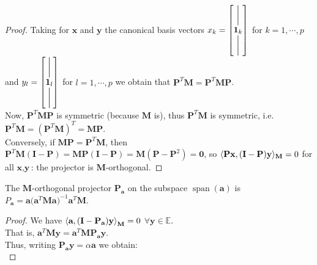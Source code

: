 \begin{notechapter}
\begin{proof}
Taking for $\textbf{x}$ and $\textbf{y}$ the canonical basis vectors $x_k = 
\begin{bmatrix*}
    \vertbar\\
    {\textbf{1}}_{k} \\
    \vertbar
\end{bmatrix*}$ for $k = 1, \cdots, p$ 
and  
$y_l = 
\begin{bmatrix*}
    \vertbar\\
    {\textbf{1}}_{l} \\
    \vertbar
\end{bmatrix*}$ for $l = 1, \cdots, p$ 
we obtain that  $\textbf{P}^T \textbf{M} = \textbf{P}^T \textbf{M} \textbf{P}$.\\

Now, $\textbf{P}^T \textbf{M} \textbf{P}$ is symmetric (because $\textbf{M}$ is), thus $\textbf{P}^T \textbf{M}$ is symmetric,
i.e.\ $\textbf{P}^T \textbf{M} = (\textbf{P}^T \textbf{M})^T = \textbf{M} \textbf{P}$.\\

Conversely, if $\textbf{M}\textbf{P} = \textbf{P}^T\textbf{M}$, then
$\textbf{P}^T \textbf{M} (\textbf{I} - \textbf{P}) = \textbf{M}\textbf{P}(\textbf{I} - \textbf{P}) = \textbf{M}(\textbf{P} - \textbf{P}^2) = \textbf{0}$,
so $\langle \textbf{P}\textbf{x}, (\textbf{I} - \textbf{P})\textbf{y} \rangle_{\textbf{M}} = 0$ for all $\textbf{x}, \textbf{y}$: the projector is $\textbf{M}$-orthogonal.

\end{proof}

\begin{proposition}
    The $\textbf{M}$-orthogonal projector $\textbf{P}_{\textbf{a}}$ on the subspace $\operatorname{span}(\textbf{a})$ is 
    $P_{\textbf{a}} = \textbf{a} \big( \textbf{a}^T \textbf{M} \textbf{a}\big)^{-1} \textbf{a}^T \textbf{M}$.
\end{proposition}

\begin{proof} We have
    ${\langle \textbf{a}, (\textbf{I} - \textbf{P}_{\textbf{a}}) \textbf{y} \rangle}_{\textbf{M}} = 0$ \; 
    $\forall{\textbf{y}} \in \mathbb{E}$.\\

    That is, ${\textbf{a}}^T \textbf{M}  \textbf{y} = 
    {\textbf{a}}^T \textbf{M} \textbf{P}_{\textbf{a}} \textbf{y}$. \\

    Thus, writing $\textbf{P}_{\textbf{a}} \textbf{y} = \alpha \textbf{a}$ we obtain:\\


\end{proof}
\end{notechapter}
